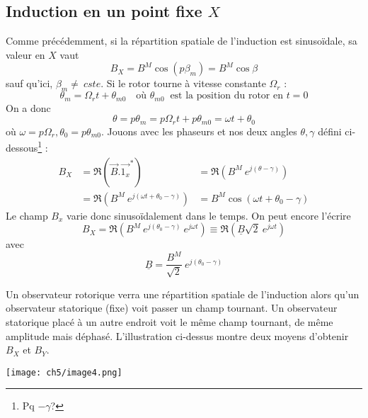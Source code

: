 	\subsection{Induction en un point fixe $X$}
	Comme précédemment, si la répartition spatiale de l'induction est sinusoïdale, 
	sa valeur en $X$ vaut 
	\begin{equation}
	B_X = B^M\cos(p\beta_m) = B^M\cos\beta
	\end{equation}
	sauf qu'ici, $\beta_m \neq\ cste$. Si le rotor tourne à vitesse constante 
	$\Omega_r$ :
	\begin{equation}
	\theta_m = \Omega_rt + \theta_{m0}\quad \text{où } \theta_{m0}\ \text{ est 
	la position du rotor en $t=0$}
	\end{equation}
	On a donc
	\begin{equation}
	\theta = p\theta_m = p\Omega_rt + p\theta_{m0} = \omega t +\theta_0
	\end{equation}
	où $\omega = p\Omega_r, \theta_0=p\theta_{m0}$. Jouons avec les phaseurs 
	et nos deux angles $\theta, \gamma$ défini ci-dessous\footnote{Pq $-\gamma$?} :
	\begin{equation}
	\begin{array}{lll}
	B_X &= \Re(\vec{B}.\vec{1_x}^*) &= \Re(B^M\ e^{j(\theta-\gamma)})\\
	&= \Re(B^M\ e^{j(\omega t + \theta_0-\gamma)}) &= B^M\cos(\omega t+\theta_0
	-\gamma)
	\end{array}
	\end{equation}
	Le champ $B_x$ varie donc sinusoïdalement dans le temps. On peut encore 
	l'écrire 
	\begin{equation}
	B_X = \Re(B^M\ e^{j(\theta_0-\gamma)}\ e^{j\omega t}) \equiv \Re(\underline{B}
	\sqrt{2}\ e^{j\omega t})
	\end{equation}
	avec 
	\begin{equation}
	\underline{B} = \dfrac{B^M}{\sqrt{2}}\ e^{j(\theta_0-\gamma)}
	\end{equation}
	

	Un observateur rotorique verra une répartition spatiale de l'induction alors 
	qu'un observateur statorique (fixe) voit passer un champ tournant. Un 
	observateur statorique placé à un autre endroit voit le même champ tournant, 
	de même amplitude mais déphasé. L'illustration ci-dessus montre deux moyens 
	d'obtenir $B_X$ et $B_Y$.
	\begin{center}
	\texttt{[image: ch5/image4.png]}
	\end{center}
	


